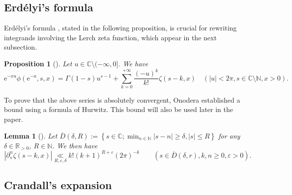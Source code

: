 \documentclass[a4paper]{amsart}
\newtheorem{proposition}[theorem]{Proposition}
\newtheorem{lemma}[theorem]{Lemma}
\theoremstyle{remark}
\theoremstyle{definition}
\newcommand{\phie}{\mathrm{e}}
\begin{document}
\subsection{Erdélyi's formula}

Erdélyi’s formula \cite[§1.11]{bateman1953higher}, stated in the following proposition, is crucial for rewriting integrands involving the Lerch zeta function, which appear in the next subsection.

\begin{proposition}[\cite{onodera2021multiple}]
\label{prop:Erdelyi_formula}
Let $u \in \mathbb{C} \setminus (-\infty,0]$. We have
$$\phie^{-xu} \phi(\phie^{-u},s,x) = \Gamma(1-s) u^{s-1} + \sum_{k=0}^{+\infty} \frac{(-u)^{k}}{k!} \zeta(s-k,x) \quad ( |u|<2\pi, s \in \mathbb{C}\setminus \mathbb{N}, x>0).$$
\end{proposition}

To prove that the above series is absolutely convergent, Onodera established a bound using a formula of Hurwitz. This bound will also be used later in the paper.

\begin{lemma}[\cite{onodera2021multiple}]
\label{lem:bound_hurwitz_zeta}
Let $\overline{D}(\delta,R) := \left\{ s \in \mathbb{C}; \min_{n \in \mathbb{N}} |s-n| \geq \delta, |s| \leq R \right\}$ for any $\delta \in \mathbb{R}_{>0}$, $R \in \mathbb{N}$. We then have
$$ |\partial_s^n \zeta(s-k,x)| \underset{R,\varepsilon,\delta}{\ll} k!(k+1)^{R+\varepsilon}(2\pi)^{-k} \qquad (s \in \overline{D}(\delta,r), k,n \geq 0, \varepsilon>0). $$
\end{lemma}

\subsection{Crandall's expansion}
\label{subsection:crandall_expansion}
\end{document}
